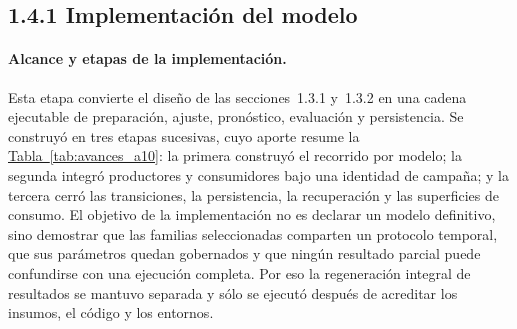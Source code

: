 \documentclass[12pt,letterpaper]{report}
\begin{document}
\subsection{1.4.1 Implementación del modelo}

\paragraph{Alcance y etapas de la implementación.} Esta etapa convierte el diseño de las
secciones~1.3.1 y~1.3.2 en una cadena ejecutable de preparación, ajuste, pronóstico,
evaluación y persistencia. Se construyó en tres etapas sucesivas, cuyo aporte
resume la \hyperref[tab:avances_a10]{Tabla~\ref*{tab:avances_a10}}: la primera construyó el recorrido por modelo; la segunda
integró productores y consumidores bajo una identidad de campaña; y la tercera cerró las
transiciones, la persistencia, la recuperación y las superficies de consumo. El objetivo de la implementación no es declarar un modelo definitivo, sino demostrar que las familias
seleccionadas comparten un protocolo temporal, que sus parámetros quedan gobernados y que
ningún resultado parcial puede confundirse con una ejecución completa. Por eso la regeneración integral de resultados se mantuvo separada y sólo se ejecutó después de acreditar los insumos,
el código y los entornos.
\end{document}
